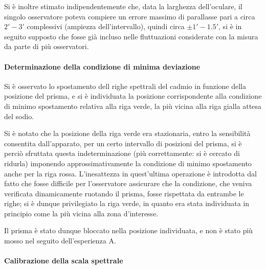 \documentclass[a4paper,10pt]{article}
\begin{document}
Si è inoltre stimato indipendentemente che, data la larghezza dell'oculare, il singolo osservatore poteva compiere un errore massimo di parallasse pari a circa $2'-3'$ complessivi (ampiezza dell'intervallo), quindi circa $\pm 1'-1.5'$, si è in seguito supposto che fosse già incluso nelle fluttuazioni considerate con la misura da parte di più osservatori.

\paragraph{Determinazione della condizione di minima deviazione} Si è osservato lo spostamento dell righe spettrali del cadmio in funzione della posizione del prisma, e si è individuata la posizione corrispondente alla condizione di minimo spostamento relativa alla riga verde, la più vicina alla riga gialla attesa del sodio.

Si è notato che la posizione della riga verde era stazionaria, entro la sensibilità consentita dall'apparato, per un certo intervallo di posizioni del prisma, si è perciò sfruttata questa indeterminazione (più correttamente: si è cercato di ridurla) imponendo approssimativamente la condizione di minimo spostamento anche per la riga rossa.
L'inesattezza in quest'ultima operazione è introdotta dal fatto che fosse difficile per l'osservatore assicurare che la condizione, che veniva verificata dinamicamente ruotando il prisma, fosse rispettata da entrambe le righe; si è dunque privilegiato la riga verde, in quanto era stata individuata in principio come la più vicina alla zona d'interesse.

Il prisma è stato dunque bloccato nella posizione individuata, e non è stato più mosso nel seguito dell'esperienza A.

\paragraph{Calibrazione della scala spettrale} 
\end{document}
